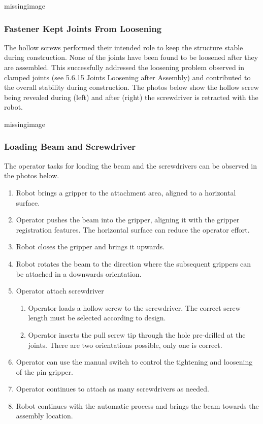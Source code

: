missingimage

\subsubsection{Fastener Kept Joints From Loosening}
\label{subsubsection:exploration_4_fastener_kept_joints_from_loosening}

The hollow screws performed their intended role to keep the structure stable during construction. None of the joints have been found to be loosened after they are assembled. This successfully addressed the loosening problem observed in clamped joints (see 5.6.15 Joints Loosening after Assembly) and contributed to the overall stability during construction. The photos below show the hollow screw being revealed during (left) and after (right) the screwdriver is retracted with the robot.

missingimage

\subsubsection{Loading Beam and Screwdriver}
\label{subsubsection:exploration_4_loading_beam_and_screwdriver}

The operator tasks for loading the beam and the screwdrivers can be observed in the photos below. 
\begin{enumerate}
    \item Robot brings a gripper to the attachment area, aligned to a horizontal surface.
    \item Operator pushes the beam into the gripper, aligning it with the gripper registration features. The horizontal surface can reduce the operator effort.
    \item Robot closes the gripper and brings it upwards.
    \item Robot rotates the beam to the direction where the subsequent grippers can be attached in a downwards orientation.
    \item Operator attach screwdriver
    \begin{enumerate}
        \item Operator loads a hollow screw to the screwdriver. The correct screw length must be selected according to design.
        \item Operator inserts the pull screw tip through the hole pre-drilled at the joints. There are two orientations possible, only one is correct.
    \end{enumerate}
    \item Operator can use the manual switch to control the tightening and loosening of the pin gripper.
    \item Operator continues to attach as many screwdrivers as needed.
    \item Robot continues with the automatic process and brings the beam towards the assembly location.
\end{enumerate}

